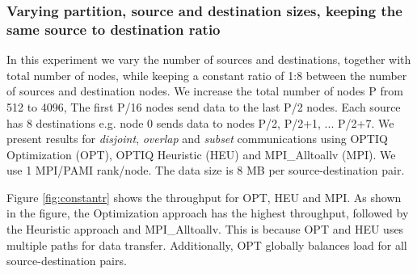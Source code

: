 \subsubsection{Varying partition, source and destination sizes, keeping the same source to destination ratio}

In this experiment we vary the number of sources and destinations, together with total number of nodes, while keeping a constant ratio of 1:8 between the number of sources and destination nodes. We increase the total number of nodes P from 512 to 4096, The first P/16 nodes send data to the last P/2 nodes. Each source has 8 destinations e.g. node 0 sends data to nodes P/2, P/2+1, ... P/2+7. We present results for {\em disjoint}, {\em overlap} and {\em subset} communications using OPTIQ Optimization (OPT), OPTIQ Heuristic (HEU) and MPI\_Alltoallv (MPI). We use 1 MPI/PAMI rank/node. The data size is 8 MB per source-destination pair. 

Figure \ref{fig:constantr} shows the throughput for OPT, HEU and MPI. As shown in the figure, the Optimization approach has the highest throughput, followed by the Heuristic approach and MPI\_Alltoallv. This is because OPT and HEU uses multiple paths for data transfer. Additionally, OPT globally balances load for all source-destination pairs. %

